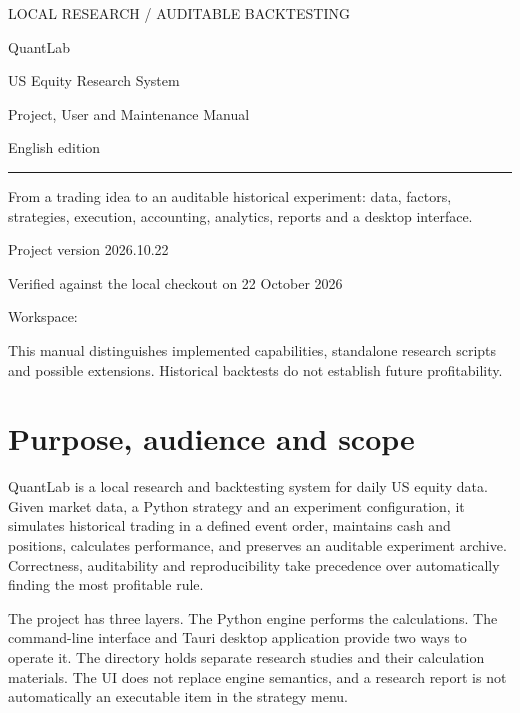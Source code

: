 \documentclass[11pt]{article}
\let\originalsection\section
\renewcommand{\section}{\Needspace{9\baselineskip}\originalsection}
\begin{document}
\begin{titlepage}
\color{ink}
{\sffamily\large LOCAL RESEARCH / AUDITABLE BACKTESTING\par}
\vspace{28mm}
{\sffamily\fontsize{42}{48}\selectfont QuantLab\par}
\vspace{8mm}
{\Huge US Equity Research System\par}
\vspace{5mm}
{\LARGE Project, User and Maintenance Manual\par}
\vspace{12mm}
{\large English edition\par}
\vfill
\rule{\linewidth}{1pt}
\vspace{5mm}
From a trading idea to an auditable historical experiment: data, factors, strategies, execution, accounting, analytics, reports and a desktop interface.

\vspace{8mm}
Project version 2026.10.22\par
Verified against the local checkout on 22 October 2026

Workspace: 

This manual distinguishes implemented capabilities, standalone research scripts and possible extensions. Historical backtests do not establish future profitability.
\end{titlepage}
\tableofcontents
\clearpage

\section{Purpose, audience and scope}
QuantLab is a local research and backtesting system for daily US equity data. Given market data, a Python strategy and an experiment configuration, it simulates historical trading in a defined event order, maintains cash and positions, calculates performance, and preserves an auditable experiment archive. Correctness, auditability and reproducibility take precedence over automatically finding the most profitable rule.

The project has three layers. The Python engine performs the calculations. The command-line interface and Tauri desktop application provide two ways to operate it. The  directory holds separate research studies and their calculation materials. The UI does not replace engine semantics, and a research report is not automatically an executable item in the strategy menu.
\end{document}
